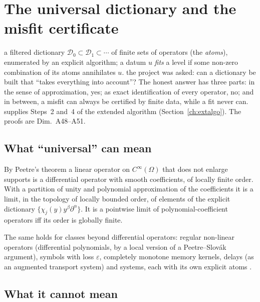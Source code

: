 \section{The universal dictionary and the misfit certificate}\label{ch:dictionary}
\sectionbrief
{a filtered dictionary $\mathcal D_0\subset\mathcal D_1\subset\cdots$ of finite sets of operators (the \emph{atoms}), enumerated by an explicit algorithm; a datum $u$ \emph{fits} a level if some non-zero combination of its atoms annihilates $u$.}
{the project was asked: can a dictionary be built that ``takes everything into account''? The honest answer has three parts: in the sense of approximation, yes; as exact identification of every operator, no; and in between, a misfit can always be certified by finite data, while a fit never can.}
{supplies Steps~2 and~4 of the extended algorithm (Section~\ref{ch:extalgo}). The proofs are Dim.~A48--A51.}

\subsection{What ``universal'' can mean}

\begin{theorem}\label{thm:dictu1}
By Peetre's theorem a linear operator on $C^\infty(\Omega)$ that does not enlarge supports is a differential operator with smooth coefficients, of locally finite order. With a partition of unity and polynomial approximation of the coefficients it is a limit, in the topology of locally bounded order, of elements of the explicit dictionary $\{\chi_j(y)y^\beta\partial^\alpha\}$. It is a pointwise limit of polynomial-coefficient operators iff its order is globally finite.
\end{theorem}

The same holds for classes beyond differential operators: regular non-linear operators (differential polynomials, by a local version of a Peetre--Slov\'ak argument), symbols with loss $\varepsilon$, completely monotone memory kernels, delays (as an augmented transport system) and systems, each with its own explicit atoms .

\subsection{What it cannot mean}

